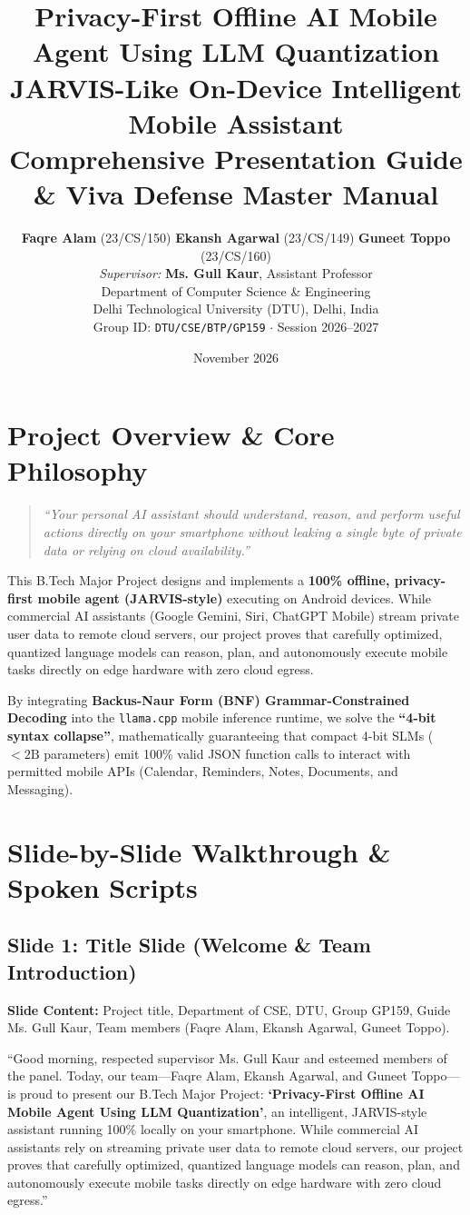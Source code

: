 \documentclass[11pt,a4paper]{article}
\title{\textbf{Privacy-First Offline AI Mobile Agent Using LLM Quantization}\\
\Large JARVIS-Like On-Device Intelligent Mobile Assistant\\
\large Comprehensive Presentation Guide \& Viva Defense Master Manual}
\author{
  \textbf{Faqre Alam} (23/CS/150) \quad
  \textbf{Ekansh Agarwal} (23/CS/149) \quad
  \textbf{Guneet Toppo} (23/CS/160)\\[0.5em]
  \textit{Supervisor:} \textbf{Ms. Gull Kaur}, Assistant Professor\\[0.3em]
  Department of Computer Science \& Engineering\\
  Delhi Technological University (DTU), Delhi, India\\
  Group ID: \texttt{DTU/CSE/BTP/GP159} $\cdot$ Session 2026--2027
}
\date{November 2026}
\begin{document}
\maketitle
\tableofcontents
\newpage

\section{Project Overview \& Core Philosophy}

\begin{quote}
\textit{``Your personal AI assistant should understand, reason, and perform useful actions directly on your smartphone without leaking a single byte of private data or relying on cloud availability.''}
\end{quote}

This B.Tech Major Project designs and implements a \textbf{100\% offline, privacy-first mobile agent (JARVIS-style)} executing on Android devices. While commercial AI assistants (Google Gemini, Siri, ChatGPT Mobile) stream private user data to remote cloud servers, our project proves that carefully optimized, quantized language models can reason, plan, and autonomously execute mobile tasks directly on edge hardware with zero cloud egress.

By integrating \textbf{Backus-Naur Form (BNF) Grammar-Constrained Decoding} into the \texttt{llama.cpp} mobile inference runtime, we solve the \textbf{``4-bit syntax collapse''}, mathematically guaranteeing that compact 4-bit SLMs ($<2\text{B}$ parameters) emit 100\% valid JSON function calls to interact with permitted mobile APIs (Calendar, Reminders, Notes, Documents, and Messaging).

\section{Slide-by-Slide Walkthrough \& Spoken Scripts}

\subsection{Slide 1: Title Slide (Welcome \& Team Introduction)}
\textbf{Slide Content:} Project title, Department of CSE, DTU, Group GP159, Guide Ms. Gull Kaur, Team members (Faqre Alam, Ekansh Agarwal, Guneet Toppo).

\begin{scriptbox}
``Good morning, respected supervisor Ms. Gull Kaur and esteemed members of the panel. Today, our team---Faqre Alam, Ekansh Agarwal, and Guneet Toppo---is proud to present our B.Tech Major Project: \textbf{`Privacy-First Offline AI Mobile Agent Using LLM Quantization'}, an intelligent, JARVIS-style assistant running 100\% locally on your smartphone. While commercial AI assistants rely on streaming private user data to remote cloud servers, our project proves that carefully optimized, quantized language models can reason, plan, and autonomously execute mobile tasks directly on edge hardware with zero cloud egress.''
\end{scriptbox}
\end{document}
